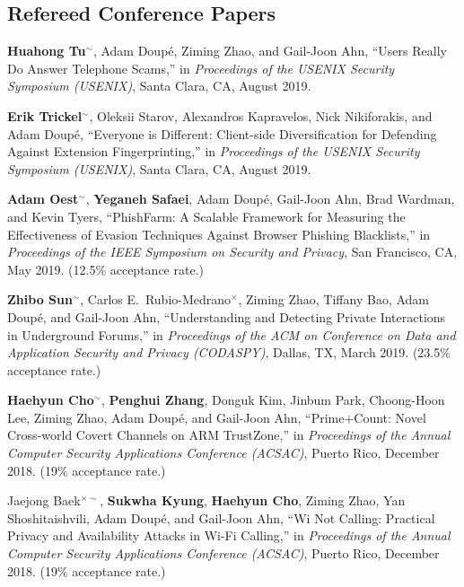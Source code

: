 \documentclass[11pt,letterpaper,sans]{moderncv}
\begin{document}
\subsection{Refereed Conference Papers}

\begin{etaremune}

\item \textbf{Huahong Tu}$^{\sim}$, Adam Doup\'e, Ziming Zhao, and Gail-Joon Ahn, ``Users Really Do Answer Telephone Scams,'' in \emph{Proceedings of the USENIX Security Symposium (USENIX)}, Santa Clara, CA, August 2019. 

\item \textbf{Erik Trickel}$^{\sim}$, Oleksii Starov, Alexandros Kapravelos, Nick Nikiforakis, and Adam Doup\'e, ``Everyone is Different: Client-side Diversification for Defending Against Extension Fingerprinting,'' in \emph{Proceedings of the USENIX Security Symposium (USENIX)}, Santa Clara, CA, August 2019. 

\item \textbf{Adam Oest}$^{\sim}$, \textbf{Yeganeh Safaei}, Adam Doup\'e, Gail-Joon Ahn, Brad Wardman, and Kevin Tyers, ``PhishFarm: A Scalable Framework for Measuring the Effectiveness of Evasion Techniques Against Browser Phishing Blacklists,'' in \emph{Proceedings of the IEEE Symposium on Security and Privacy}, San Francisco, CA, May 2019. (12.5\% acceptance rate.)
  
\item \textbf{Zhibo Sun}$^{\sim}$, Carlos E.\ Rubio-Medrano$^\times$, Ziming Zhao, Tiffany Bao, Adam Doup\'e, and Gail-Joon Ahn, ``Understanding and Detecting Private Interactions in Underground Forums,'' in \emph{Proceedings of the ACM on Conference on Data and Application Security and Privacy (CODASPY)}, Dallas, TX, March 2019. (23.5\% acceptance rate.)

\item \textbf{Haehyun Cho}$^{\sim}$, \textbf{Penghui Zhang}, Donguk Kim, Jinbum Park, Choong-Hoon Lee, Ziming Zhao, Adam Doup\'e, and Gail-Joon Ahn, ``Prime+Count: Novel Cross-world Covert Channels on ARM TrustZone,'' in \emph{Proceedings of the Annual Computer Security Applications Conference (ACSAC)}, Puerto Rico, December 2018. (19\% acceptance rate.)

\item Jaejong Baek$^{\times\sim}$, \textbf{Sukwha Kyung}, \textbf{Haehyun Cho}, Ziming Zhao, Yan Shoshitaishvili, Adam Doup\'e, and Gail-Joon Ahn, ``Wi Not Calling: Practical Privacy and Availability Attacks in Wi-Fi Calling,'' in \emph{Proceedings of the Annual Computer Security Applications Conference (ACSAC)}, Puerto Rico, December 2018. (19\% acceptance rate.)


\end{etaremune}
\end{document}
